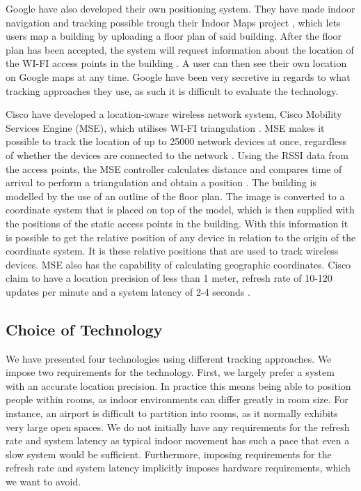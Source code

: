 Google have also developed their own positioning system. They have made indoor navigation and tracking possible trough their Indoor Maps project \cite{IPSoverGPS}, which lets users map a building by uploading a floor plan of said building. After the floor plan has been accepted, the system will request information about the location of the WI-FI access points in the building \cite{googleindoormaps}. A user can then see their own location on Google maps at any time. Google have been very secretive in regards to what tracking approaches they use, as such it is difficult to evaluate the technology.

Cisco have developed a location-aware wireless network system, Cisco Mobility Services Engine (MSE), which utilises WI-FI triangulation \cite{CiscoTri}. MSE makes it possible to track the location of up to 25000 network devices at once, regardless of whether the devices are connected to the network \cite{cisco25000}. Using the RSSI data from the access points, the MSE controller calculates distance and compares time of arrival to perform a triangulation and obtain a position \cite{ciscoMSE}.
The building is modelled by the use of an outline of the floor plan. The image is converted to a coordinate system that is placed on top of the model, which is then supplied with the positions of the static access points in the building. With this information it is possible to get the relative position of any device in relation to the origin of the coordinate system. It is these relative positions that are used to track wireless devices. MSE also has the capability of calculating geographic coordinates.
Cisco claim to have a location precision of less than 1 meter, refresh rate of 10-120 updates per minute and a system latency of 2-4 seconds \cite{dimensions}. 

\subsection{Choice of Technology}\label{subsec:cisco}
We have presented four technologies using different tracking approaches. We impose two requirements for the technology. First, we largely prefer a system with an accurate location precision. In practice this means being able to position people within rooms, as indoor environments can differ greatly in room size. For instance, an airport is difficult to partition into rooms, as it normally exhibits very large open spaces. We do not initially have any requirements for the refresh rate and system latency as typical indoor movement has such a pace that even a slow system would be sufficient. Furthermore, imposing requirements for the refresh rate and system latency implicitly imposes hardware requirements, which we want to avoid. 

